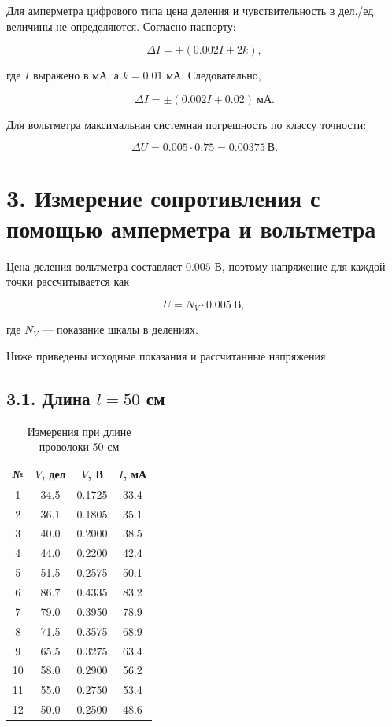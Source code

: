 \documentclass[12pt,a4paper]{article}
\begin{document}
Для амперметра цифрового типа цена деления и чувствительность
в дел./ед. величины не определяются. Согласно паспорту:

\begin{equation}
\Delta I=
\pm(0.002I+2k),
\end{equation}

где $I$ выражено в мА, а $k=0.01$ мА. Следовательно,

\begin{equation}
\Delta I=
\pm(0.002I+0.02)\ \text{мА}.
\end{equation}

Для вольтметра максимальная системная погрешность по классу
точности:

\begin{equation}
\Delta U=
0.005\cdot0.75
=
0.00375\ \text{В}.
\end{equation}


\section*{3. Измерение сопротивления с помощью амперметра и вольтметра}

Цена деления вольтметра составляет $0.005$ В, поэтому напряжение
для каждой точки рассчитывается как

\begin{equation}
U=N_V\cdot0.005\ \text{В},
\end{equation}

где $N_V$ --- показание шкалы в делениях.

Ниже приведены исходные показания и рассчитанные напряжения.


\subsection*{3.1. Длина $l=50$ см}

\begin{table}[H]
\centering
\caption{Измерения при длине проволоки 50 см}
\begin{tabular}{c|c|c|c}
\toprule
№ & $V$, дел & $V$, В & $I$, мА\\
\midrule
1&34.5&0.1725&33.4\\
2&36.1&0.1805&35.1\\
3&40.0&0.2000&38.5\\
4&44.0&0.2200&42.4\\
5&51.5&0.2575&50.1\\
6&86.7&0.4335&83.2\\
7&79.0&0.3950&78.9\\
8&71.5&0.3575&68.9\\
9&65.5&0.3275&63.4\\
10&58.0&0.2900&56.2\\
11&55.0&0.2750&53.4\\
12&50.0&0.2500&48.6\\
\bottomrule
\end{tabular}
\end{table}
\end{document}
